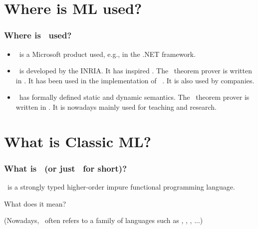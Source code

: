 \documentclass[12pt,red]{beamer}
\begin{document}
\section{Where is ML used?}


\begin{frame}
  \frametitle{Where is \ML\ used?}

  \begin{itemize}
  \item \fsharp\ is a Microsoft product used, e.g., in the .NET
    framework.

    \vspace{0.1in}

  \item \OCAML\ is developed by the INRIA.  It has inspired \fsharp.
    The \COQ\ theorem prover is written in \OCAML.
    It has been used in the implementation of
    \ENSEMBLE~\cite{Hayden:98a,Birman+al:2000a}.
    It is also used by companies.

    \vspace{0.1in}

  \item \SML\ has formally defined static and dynamic semantics.  The
    \HOL\ theorem prover is written in \SML.  It is nowadays mainly
    used for teaching and research.
  \end{itemize}
\end{frame}


\section{What is Classic ML?}


\begin{frame}
  \frametitle{What is \CML\ (or just \ML\ for short)?}

  \ML\ is a strongly typed higher-order impure functional programming language.

  \vspace{0.2in}

  What does it mean?

  \vspace{0.8in}

  \begin{footnotesize}
    (Nowadays, \ML\ often refers to a family of languages such as \CML,
    \SML, \CAML, \fsharp...)
  \end{footnotesize}
\end{frame}
\end{document}
